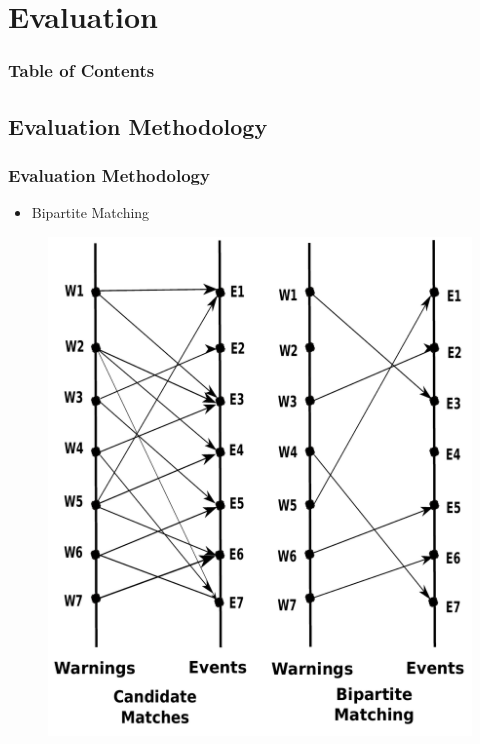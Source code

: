 \documentclass[red]{beamer}
\begin{document}
\section{Evaluation}
\begin{frame}
\frametitle{Table of Contents}
\tableofcontents[currentsection]
\end{frame}

\subsection{Evaluation Methodology}
\begin{frame}
\frametitle{Evaluation Methodology}
    \begin{itemize}
        \item
            Bipartite Matching
    \end{itemize}
    \begin{figure}
        \includegraphics[height=0.7\textheight]{matching}
    \end{figure}

\end{frame}
\end{document}
